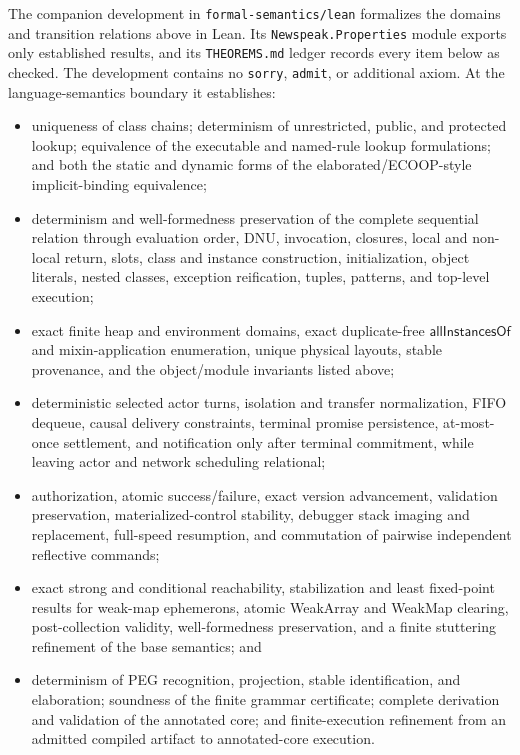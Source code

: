 \documentclass[11pt]{article}
\numberwithin{equation}{section}
\newcommand{\kw}[1]{\ensuremath{\mathsf{#1}}}
\begin{document}
The companion development in \texttt{formal-semantics/lean} formalizes the
domains and transition relations above in Lean.  Its
\texttt{Newspeak.Properties} module exports only established results, and its
\texttt{THEOREMS.md} ledger records every item below as checked.  The
development contains no \texttt{sorry}, \texttt{admit}, or additional axiom.
At the language-semantics boundary it establishes:
\begin{itemize}
\item uniqueness of class chains; determinism of unrestricted, public, and
      protected lookup; equivalence of the executable and named-rule lookup
      formulations; and both the static and dynamic forms of the
      elaborated/ECOOP-style implicit-binding equivalence;
\item determinism and well-formedness preservation of the complete sequential
      relation through evaluation order, DNU, invocation, closures, local and
      non-local return, slots, class and instance construction, initialization,
      object literals, nested classes, exception reification, tuples, patterns,
      and top-level execution;
\item exact finite heap and environment domains, exact duplicate-free
      \kw{allInstancesOf} and mixin-application enumeration, unique physical
      layouts, stable provenance, and the object/module invariants listed
      above;
\item deterministic selected actor turns, isolation and transfer
      normalization, FIFO dequeue, causal delivery constraints, terminal
      promise persistence, at-most-once settlement, and notification only
      after terminal commitment, while leaving actor and network scheduling
      relational;
\item authorization, atomic success/failure, exact version advancement,
      validation preservation, materialized-control stability, debugger stack
      imaging and replacement, full-speed resumption, and commutation of
      pairwise independent reflective commands;
\item exact strong and conditional reachability, stabilization and least
      fixed-point results for weak-map ephemerons, atomic WeakArray and WeakMap
      clearing, post-collection validity, well-formedness preservation, and a
      finite stuttering refinement of the base semantics; and
\item determinism of PEG recognition, projection, stable identification, and
      elaboration; soundness of the finite grammar certificate; complete
      derivation and validation of the annotated core; and finite-execution
      refinement from an admitted compiled artifact to annotated-core
      execution.
\end{itemize}
\end{document}
